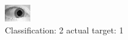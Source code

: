 \begin{figure}[h!]
\begin{center}
\includegraphics[width=0.60\columnwidth]{figures/ID1579_class_2_target_1.png}
\end{center}
\caption{ Classification: 2 actual target: 1}
\label{fig:ID1579_class_2_target_1}
\end{figure}
